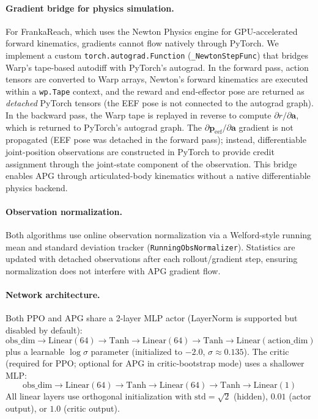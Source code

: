\documentclass[11pt,a4paper]{article}
\newcommand{\bpf}{\mathbf{p}}
\newcommand{\ba}{\mathbf{a}}
\begin{document}
\paragraph{Gradient bridge for physics simulation.}
\label{sec:gradient_bridge}
For FrankaReach, which uses the Newton Physics engine for GPU-accelerated forward kinematics, gradients cannot flow natively through PyTorch. We implement a custom \texttt{torch.autograd.Function} (\texttt{\_NewtonStepFunc}) that bridges Warp's tape-based autodiff with PyTorch's autograd. In the forward pass, action tensors are converted to Warp arrays, Newton's forward kinematics are executed within a \texttt{wp.Tape} context, and the reward and end-effector pose are returned as \emph{detached} PyTorch tensors (the EEF pose is not connected to the autograd graph). In the backward pass, the Warp tape is replayed in reverse to compute $\partial r / \partial \ba$, which is returned to PyTorch's autograd graph. The $\partial \bpf_{\text{eef}} / \partial \ba$ gradient is not propagated (EEF pose was detached in the forward pass); instead, differentiable joint-position observations are constructed in PyTorch to provide credit assignment through the joint-state component of the observation. This bridge enables APG through articulated-body kinematics without a native differentiable physics backend.

\paragraph{Observation normalization.}
Both algorithms use online observation normalization via a Welford-style running mean and standard deviation tracker (\texttt{RunningObsNormalizer}). Statistics are updated with detached observations after each rollout/gradient step, ensuring normalization does not interfere with APG gradient flow.

\paragraph{Network architecture.}
Both PPO and APG share a 2-layer MLP actor (LayerNorm is supported but disabled by default):
\[
  \text{obs\_dim} \rightarrow \text{Linear}(64) \rightarrow \text{Tanh} \rightarrow \text{Linear}(64) \rightarrow \text{Tanh} \rightarrow \text{Linear}(\text{action\_dim})
\]
plus a learnable $\log\sigma$ parameter (initialized to $-2.0$, $\sigma \approx 0.135$). The critic (required for PPO; optional for APG in critic-bootstrap mode) uses a shallower MLP:
\[
  \text{obs\_dim} \rightarrow \text{Linear}(64) \rightarrow \text{Tanh} \rightarrow \text{Linear}(64) \rightarrow \text{Tanh} \rightarrow \text{Linear}(1)
\]
All linear layers use orthogonal initialization with $\text{std} = \sqrt{2}$ (hidden), $0.01$ (actor output), or $1.0$ (critic output).
\end{document}
